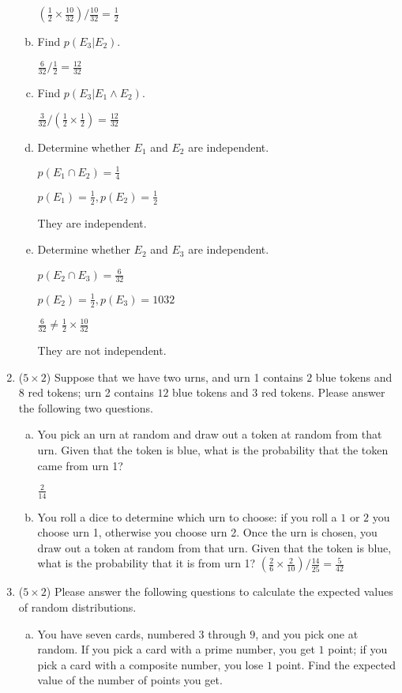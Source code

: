 \documentclass[12pt]{article}
\begin{document}
\begin{enumerate}
\begin{enumerate}[a.]
			$ (\frac{1}{2} \times \frac{10}{32})/\frac{10}{32} = \frac{1}{2}$

			\item Find $p(E_3|E_2)$.

			$ \frac{6}{32}/\frac{1}{2} = \frac{12}{32}$

			\item Find $p(E_3|E_1 \wedge E_2)$.

			$ \frac{3}{32}/(\frac{1}{2}\times\frac{1}{2}) = \frac{12}{32}$
			\item Determine whether $E_1$ and $E_2$ are independent.

			$p(E_1 \cap E_2) = \frac{1}{4}$

			$p(E_1) = \frac{1}{2}, p(E_2) = \frac{1}{2}$

			They are independent.

			\item Determine whether $E_2$ and $E_3$ are independent.

			$p(E_2 \cap E_3) = \frac{6}{32}$

			$p(E_2) = \frac{1}{2}, p(E_3) = {10}{32}$

			$\frac{6}{32} \neq \frac{1}{2} \times \frac{10}{32}$

			They are not independent.
		\end{enumerate}

					\newpage
		\item ($5 \times 2$)
		Suppose that we have two urns, and urn 1 contains $2$ blue tokens and $8$ red tokens; urn 2 contains $12$ blue tokens and $3$ red tokens. Please answer the following two questions.
		\begin{enumerate}[a.]
			\item You pick an urn at random and draw out a token at random from that urn. Given that the token is blue, what is the probability that the token came from urn 1?

			$\frac{2}{14}$
			\item You roll a dice to determine which urn to choose: if you roll a $1$ or $2$ you choose urn 1, otherwise you choose urn 2. Once the urn is chosen, you draw out a token at random from that urn. Given that the token is blue, what is the probability that it is from urn 1?
			$(\frac{2}{6} \times \frac{2}{10})/\frac{14}{25} = \frac{5}{42}$
		\end{enumerate}

					\newpage
		\item ($5 \times 2$)
		Please answer the following questions to calculate the expected values of random distributions.
		\begin{enumerate}[a.]
			\item You have seven cards, numbered $3$ through $9$, and you pick one at random. If you pick a card with a prime number, you get $1$ point; if you pick a card with a composite number, you lose $1$ point. Find the expected value of the number of points you get.


\end{enumerate}
\end{enumerate}
\end{document}
